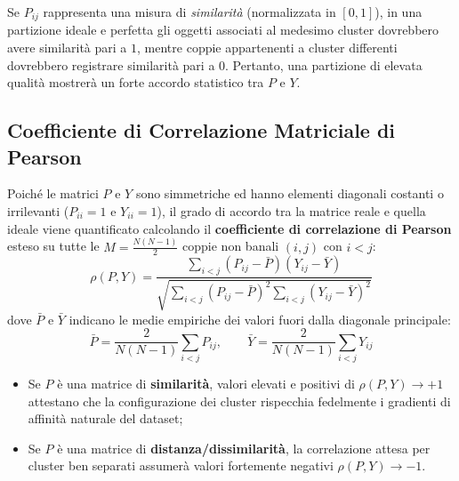 Se $P_{ij}$ rappresenta una misura di \textit{similarità} (normalizzata in $[0, 1]$), in una partizione ideale e perfetta gli oggetti associati al medesimo cluster dovrebbero avere similarità pari a $1$, mentre coppie appartenenti a cluster differenti dovrebbero registrare similarità pari a $0$. Pertanto, una partizione di elevata qualità mostrerà un forte accordo statistico tra $P$ e $Y$.

\FloatBarrier
\subsection{Coefficiente di Correlazione Matriciale di Pearson}
Poiché le matrici $P$ e $Y$ sono simmetriche ed hanno elementi diagonali costanti o irrilevanti ($P_{ii} = 1$ e $Y_{ii} = 1$), il grado di accordo tra la matrice reale e quella ideale viene quantificato calcolando il \textbf{coefficiente di correlazione di Pearson} esteso su tutte le $M = \frac{N(N-1)}{2}$ coppie non banali $(i, j)$ con $i < j$:
\begin{equation}
\label{eq:dm-matrix-correlation-formula}
\rho(P, Y) = \frac{\sum_{i < j} \left(P_{ij} - \bar{P}\right)\left(Y_{ij} - \bar{Y}\right)}{\sqrt{\sum_{i < j} \left(P_{ij} - \bar{P}\right)^2 \sum_{i < j} \left(Y_{ij} - \bar{Y}\right)^2}}
\end{equation}
dove $\bar{P}$ e $\bar{Y}$ indicano le medie empiriche dei valori fuori dalla diagonale principale:
\begin{equation}
\bar{P} = \frac{2}{N(N-1)} \sum_{i < j} P_{ij}, \qquad \bar{Y} = \frac{2}{N(N-1)} \sum_{i < j} Y_{ij}
\end{equation}

\begin{itemize}[noitemsep]
    \item Se $P$ è una matrice di \textbf{similarità}, valori elevati e positivi di $\rho(P, Y) \to +1$ attestano che la configurazione dei cluster rispecchia fedelmente i gradienti di affinità naturale del dataset;
    \item Se $P$ è una matrice di \textbf{distanza/dissimilarità}, la correlazione attesa per cluster ben separati assumerà valori fortemente negativi $\rho(P, Y) \to -1$.
\end{itemize}

\FloatBarrier
